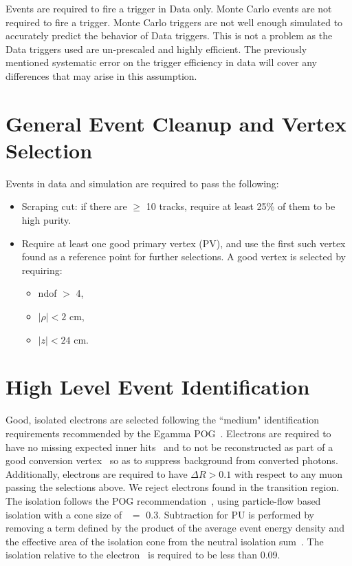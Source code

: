 Events are required to fire a trigger in Data only. Monte Carlo events are not required to fire a trigger. Monte Carlo triggers are not well enough simulated to accurately predict the behavior of Data triggers. This is not a problem as the Data triggers used are un-prescaled and highly efficient. The previously mentioned systematic error on the trigger efficiency in data will cover any differences that may arise in this assumption.




\section{General Event Cleanup and Vertex Selection}
\label{sec::EventCleanup}

Events in data and simulation are required to pass the following:

\begin{itemize}
\item Scraping cut: if there are $\geq$ 10 tracks, require at least 25\% of them to be high purity. 
\item Require at least one good primary vertex (PV), and use the first such vertex found as a reference point for further selections.  A good vertex is selected by requiring:
	\begin{itemize}
	\item ndof $>$ 4,
	\item $|\rho| < 2$ cm,
	\item $|z| < 24$ cm.  
	\end{itemize}
\end{itemize}
	 
	 
\section{High Level Event Identification}	 
\label{sec:EventSelections}
Good, isolated electrons are selected following the ``medium" identification requirements recommended by the Egamma POG~\cite{egammaidtwiki}.
Electrons are required to have no missing expected inner hits~\cite{conv} and to not be reconstructed as part of a good conversion vertex~\cite{hwwsmurf} so as to suppress background from converted photons.
Additionally, electrons are required to have $\Delta R >0.1$ with respect to any muon passing the selections above.
We reject electrons found in the transition region.
The isolation follows the POG recommendation~\cite{egammapfisotwiki}, using particle-flow based isolation with a cone size of \DR\  $=$ 0.3.  
Subtraction for PU is performed by removing a term defined by the product of the average event energy density and the effective area of the isolation cone from the neutral isolation sum~\cite{egammaisorhoaeff}.
The isolation relative to the electron \pt\ is required to be less than 0.09.\\

